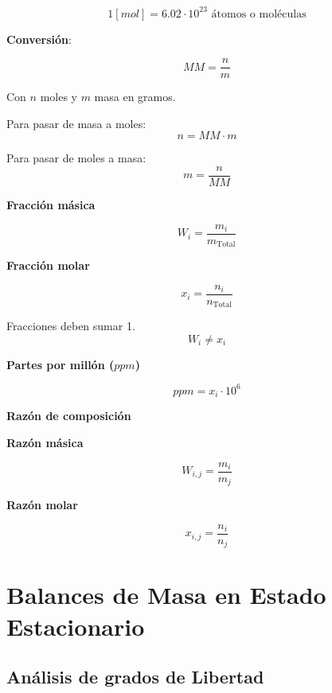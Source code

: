             \[1 [mol] = 6.02 \cdot 10^{23} \text{ átomos o moléculas}\]
            
            \begin{multicols}{2}
                \textbf{Conversión}:
            
                \[MM = \frac{n}{m}\]
                
                Con \(n\) moles y \(m\) masa en gramos.
                
                Para pasar de masa a moles:
                \[n = MM \cdot m\]
                
                Para pasar de moles a masa:
                \[m = \frac{n}{MM}\]
            \end{multicols}
            
            
            \begin{multicols}{2}
                \textbf{Fracción másica}
            
                \[W_{i} = \frac{m_{i}}{m_{\text{Total}}}\]
                
                \textbf{Fracción molar}
                
                \[x_{i} = \frac{n_{i}}{n_{\text{Total}}}\]
                
                Fracciones deben sumar 1.
                \[W_{i} \neq x_{i}\]
                
                \textbf{Partes por millón (\(ppm\))}
                
                \[ppm = x_{i} \cdot 10^{6}\]
                
                \textbf{Razón de composición}
                
                \textbf{Razón másica}
                
                \[W_{i,j} = \frac{m_{i}}{m_{j}}\]
                
                \textbf{Razón molar}
                
                \[x_{i,j} = \frac{n_{i}}{n_{j}}\]
            \end{multicols}

\section{Balances de Masa en Estado Estacionario}

    \subsection{Análisis de grados de Libertad}
    
